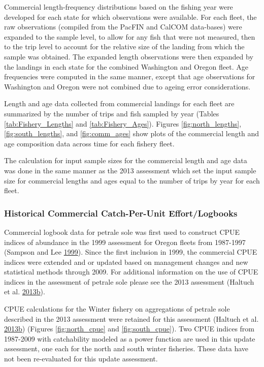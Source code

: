 \documentclass[12pt,]{article}
\begin{document}
Commercial length-frequency distributions based on the fishing year were
developed for each state for which observations were available. For each
fleet, the raw observations (compiled from the PacFIN and CalCOM
data-bases) were expanded to the sample level, to allow for any fish
that were not measured, then to the trip level to account for the
relative size of the landing from which the sample was obtained. The
expanded length observations were then expanded by the landings in each
state for the combined Washington and Oregon fleet. Age frequencies were
computed in the same manner, except that age observations for Washington
and Oregon were not combined due to ageing error considerations.

Length and age data collected from commercial landings for each fleet
are summarized by the number of trips and fish sampled by year (Tables
\ref{tab:Fishery_Lengths} and \ref{tab:Fishery_Ages}). Figures
\ref{fig:north_lengths}, \ref{fig:south_lengths}, and
\ref{fig:comm_ages} show plots of the commercial length and age
composition data across time for each fishery fleet.

The calculation for input sample sizes for the commercial length and age
data was done in the same manner as the 2013 assessment which set the
input sample size for commercial lengths and ages equal to the number of
trips by year for each fleet.

\subsubsection{Historical Commercial Catch-Per-Unit
Effort/Logbooks}\label{historical-commercial-catch-per-unit-effortlogbooks}

Commercial logbook data for petrale sole was first used to construct
CPUE indices of abundance in the 1999 assessment for Oregon fleets from
1987-1997 (Sampson and Lee
\protect\hyperlink{ref-sampson_assessment_1999}{1999}). Since the first
inclusion in 1999, the commercial CPUE indices were extended and or
updated based on management changes and new statistical methods through
2009. For additional information on the use of CPUE indices in the
assessment of petrale sole please see the 2013 assessment (Haltuch et
al.
\protect\hyperlink{ref-haltuch_status_2013}{2013}\protect\hyperlink{ref-haltuch_status_2013}{b}).

CPUE calculations for the Winter fishery on aggregations of petrale sole
described in the 2013 assessment were retained for this assessment
(Haltuch et al.
\protect\hyperlink{ref-haltuch_status_2013}{2013}\protect\hyperlink{ref-haltuch_status_2013}{b})
(Figures \ref{fig:north_cpue} and \ref{fig:south_cpue}). Two CPUE
indices from 1987-2009 with catchability modeled as a power function are
used in this update assessment, one each for the north and south winter
fisheries. These data have not been re-evaluated for this update
assessment.
\end{document}

